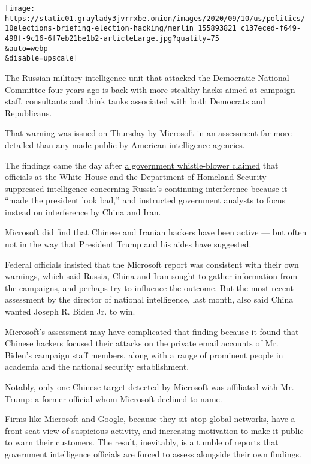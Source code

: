 \texttt{[image: https://static01.graylady3jvrrxbe.onion/images/2020/09/10/us/politics/10elections-briefing-election-hacking/merlin\_155893821\_c137eced-f649-498f-9c16-6f7eb21be1b2-articleLarge.jpg?quality=75\\\&auto=webp\\\&disable=upscale]}

The Russian military intelligence unit that attacked the Democratic
National Committee four years ago is back with more stealthy hacks aimed
at campaign staff, consultants and think tanks associated with both
Democrats and Republicans.

That warning was issued on Thursday by Microsoft in an assessment far
more detailed than any made public by American intelligence agencies.

The findings came the day after
\href{https://www.nytimes3xbfgragh.onion/2020/09/09/us/politics/homeland-security-russia-trump.html}{a
government whistle-blower claimed} that officials at the White House and
the Department of Homeland Security suppressed intelligence concerning
Russia's continuing interference because it ``made the president look
bad,'' and instructed government analysts to focus instead on
interference by China and Iran.

Microsoft did find that Chinese and Iranian hackers have been active ---
but often not in the way that President Trump and his aides have
suggested.

Federal officials insisted that the Microsoft report was consistent with
their own warnings, which said Russia, China and Iran sought to gather
information from the campaigns, and perhaps try to influence the
outcome. But the most recent assessment by the director of national
intelligence, last month, also said China wanted Joseph R. Biden Jr. to
win.

Microsoft's assessment may have complicated that finding because it
found that Chinese hackers focused their attacks on the private email
accounts of Mr. Biden's campaign staff members, along with a range of
prominent people in academia and the national security establishment.

Notably, only one Chinese target detected by Microsoft was affiliated
with Mr. Trump: a former official whom Microsoft declined to name.

Firms like Microsoft and Google, because they sit atop global networks,
have a front-seat view of suspicious activity, and increasing motivation
to make it public to warn their customers. The result, inevitably, is a
tumble of reports that government intelligence officials are forced to
assess alongside their own findings.

